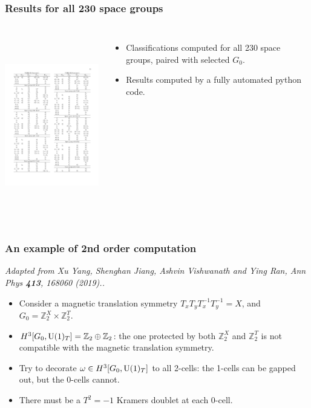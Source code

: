 \documentclass[xcolor=table, aspectratio=169,ignorenonframetext]{beamer}
\newcommand{\uone}{\text U(1)}
\begin{document}
\begin{frame}
	\frametitle{Results for all 230 space groups}
	\begin{columns}
		\includegraphics[height=8cm]{../spspt/bigtable}
		\begin{itemize}
			\item Classifications computed for all 230 space groups, paired with selected $G_0$.
			\item Results computed by a fully automated python code.
		\end{itemize}
	\end{columns}
\end{frame}

\begin{frame}
\frametitle{An example of 2nd order computation}
\emph{\small Adapted from Xu Yang, Shenghan Jiang, Ashvin Vishwanath and Ying Ran, Ann Phys \textbf{413}, 168060 (2019)..}
\begin{itemize}
	\item Consider a magnetic translation symmetry $T_xT_yT_x^{-1}T_y^{-1} = X$, and $G_0=\mathbb Z_2^X\times\mathbb Z_2^T$.
	\item $H^3[G_0,\uone_T]=\mathbb Z_2\oplus\mathbb Z_2$: the one protected by both $\mathbb Z_2^X$ and $\mathbb Z_2^T$ is \alert{not compatible} with the magnetic translation symmetry.
	\item Try to decorate $\omega\in H^3[G_0,\uone_T]$ to all 2-cells: the 1-cells can be gapped out, but the 0-cells \alert{cannot}.
	\item There must be a $T^2=-1$ Kramers doublet at each 0-cell.
\end{itemize}
\begin{center}
\end{center}
\end{frame}
\end{document}
